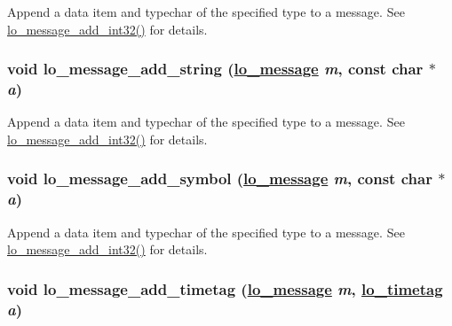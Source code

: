 Append a data item and typechar of the specified type to a message. See \hyperlink{group__liblolowlevel_g31ac1e4c0ec6c61f665ce3f9bbdc53c3}{lo\_\-message\_\-add\_\-int32()} for details. 

\hypertarget{group__liblolowlevel_g79458d53ab8f13ce3369b764d094d3c4}{
\subsubsection[lo\_\-message\_\-add\_\-string]{\setlength{\rightskip}{0pt plus 5cm}void lo\_\-message\_\-add\_\-string (\hyperlink{lo__types_8h_d126083c98d941f00eb72d1690b38d63}{lo\_\-message} {\em m}, const char $\ast$ {\em a})}}
\label{group__liblolowlevel_g79458d53ab8f13ce3369b764d094d3c4}


Append a data item and typechar of the specified type to a message. See \hyperlink{group__liblolowlevel_g31ac1e4c0ec6c61f665ce3f9bbdc53c3}{lo\_\-message\_\-add\_\-int32()} for details. 

\hypertarget{group__liblolowlevel_ga8e9583532819604e6b706e5d4a3cf1f}{
\subsubsection[lo\_\-message\_\-add\_\-symbol]{\setlength{\rightskip}{0pt plus 5cm}void lo\_\-message\_\-add\_\-symbol (\hyperlink{lo__types_8h_d126083c98d941f00eb72d1690b38d63}{lo\_\-message} {\em m}, const char $\ast$ {\em a})}}
\label{group__liblolowlevel_ga8e9583532819604e6b706e5d4a3cf1f}


Append a data item and typechar of the specified type to a message. See \hyperlink{group__liblolowlevel_g31ac1e4c0ec6c61f665ce3f9bbdc53c3}{lo\_\-message\_\-add\_\-int32()} for details. 

\hypertarget{group__liblolowlevel_g2cbd8e6222b589b3ccb7b47f7ee147cc}{
\subsubsection[lo\_\-message\_\-add\_\-timetag]{\setlength{\rightskip}{0pt plus 5cm}void lo\_\-message\_\-add\_\-timetag (\hyperlink{lo__types_8h_d126083c98d941f00eb72d1690b38d63}{lo\_\-message} {\em m}, \hyperlink{structlo__timetag}{lo\_\-timetag} {\em a})}}
\label{group__liblolowlevel_g2cbd8e6222b589b3ccb7b47f7ee147cc}


